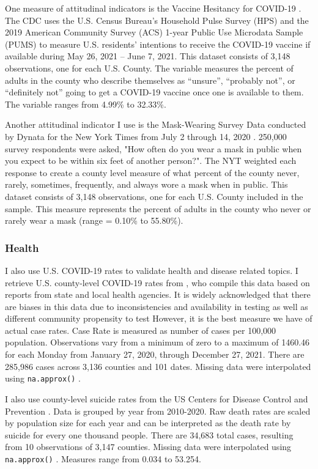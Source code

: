One measure of attitudinal indicators is the Vaccine Hesitancy for COVID-19
\citep{vaches_data}. The CDC uses the U.S. Census Bureau’s Household Pulse Survey
(HPS) and the 2019 American Community Survey (ACS) 1-year Public Use Microdata
Sample (PUMS) to measure U.S. residents’ intentions to receive the COVID-19
vaccine if available during May 26, 2021 – June 7, 2021. This dataset consists
of 3,148 observations, one for each U.S. County. The variable
measures the percent of adults in the county who describe themselves as
“unsure”, “probably not”, or “definitely not” going to get a COVID-19 vaccine
once one is available to them. The variable ranges from 4.99\% to 32.33\%. 

Another attitudinal indicator I use is the Mask-Wearing Survey Data conducted by
Dynata for the New York Times from July 2 through 14, 2020 \citep{mask_data}. 250,000
survey respondents were asked, "How often do you wear a mask in public when you
expect to be within six feet of another person?". The NYT weighted each response
to create a county level measure of what percent of the county never, rarely,
sometimes, frequently, and always wore a mask when in public. This dataset
consists of 3,148 observations, one for each U.S. County included in the sample. This measure
represents the percent of adults in the county who never or rarely wear a mask
(range = 0.10\% to 55.80\%).

\subsubsection{Health}

I also use U.S. COVID-19 rates to validate health and disease related topics. I
retrieve U.S. county-level COVID-19 rates from \citet{covid_data}, who compile this
data based on reports from state and local health agencies. It is widely
acknowledged that there are biases in this data due to inconsistencies and
availability in testing as well as different community propensity to test
\citep{gu22, cdc20a} However, it is the best measure we have of actual case rates.
Case Rate is measured as number of cases per 100,000 population. Observations
vary from a minimum of zero to a maximum of 1460.46 for each Monday from January 27, 2020, through
December 27, 2021. There are 285,986 cases across 3,136 counties and 101
dates. Missing data were interpolated using \texttt{na.approx()} \citep{zoo}.

I also use county-level suicide rates from the US Centers for Disease Control
and Prevention \citeyearpar{suic_data}. Data is grouped by year from 2010-2020. Raw death
rates are scaled by population size for each year and can be interpreted as the
death rate by suicide for every one thousand people. There are 34,683 total
cases, resulting from 10 observations of 3,147 counties. Missing data were interpolated using
\texttt{na.approx()} \citep{zoo}. Measures range from 0.034 to 53.254.

